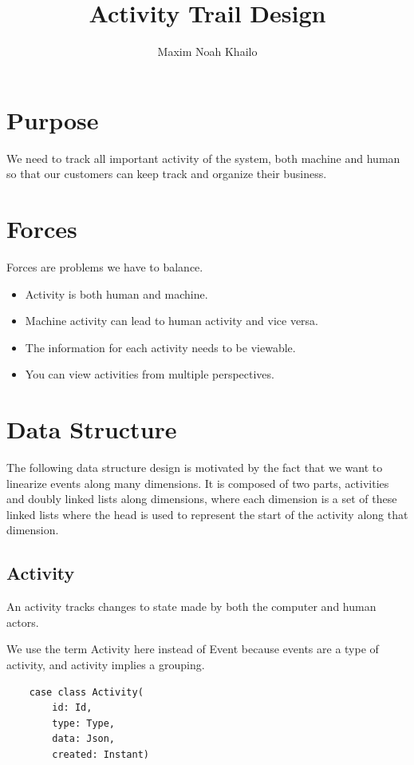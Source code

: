 \documentclass[11pt]{article}
\title{Activity Trail Design}
\author{Maxim Noah Khailo}
\begin{document}
\maketitle
\section{Purpose}

We need to track all important activity of the system, both machine and human so that
our customers can keep track and organize their business.

\section{Forces}

Forces are problems we have to balance.

\begin{itemize}
    \item Activity is both human and machine.
    \item Machine activity can lead to human activity and vice versa.
    \item The information for each activity needs to be viewable. 
    \item You can view activities from multiple perspectives.
\end{itemize}


\section{Data Structure}

The following data structure design is motivated by the fact that we want to linearize 
events along many dimensions. It is composed of two parts, activities and doubly linked
lists along dimensions, where each dimension is a set of these linked lists where the head
is used to represent the start of the activity along that dimension. 


\newpage
\subsection{Activity}

An activity tracks changes to state made by both the computer and human actors.

We use the term Activity here instead of Event because events are a type of activity, and
activity implies a grouping.

\begin{lstlisting}
    case class Activity(
        id: Id, 
        type: Type, 
        data: Json, 
        created: Instant)
\end{lstlisting}
\end{document}
